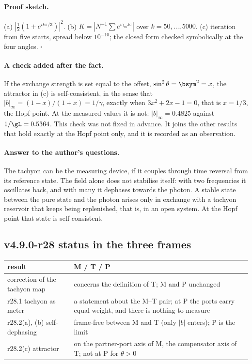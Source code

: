 \paragraph{Proof sketch.}
(a) \(|\tfrac12(1+e^{ik\pi/3})|^2\).  (b) \(K=|N^{-1}\sum e^{i\gamma_mk\tau}|\) over \(k=50,\dots,5000\).  (c) iteration from five starts, spread below
\(10^{-10}\); the closed form checked symbolically at the four angles.  \(\square\)

\paragraph{A check added after the fact.}
If the exchange strength is set equal to the offset, \(\sin^2\theta=\bsym^2=x\), the attractor in (c) is self-consistent, in the sense that
\(|b|_\infty=(1-x)/(1+x)=1/\gamma\), exactly when \(3x^2+2x-1=0\), that is \(x=1/3\), the Hopf point.  At the measured values it is not:
\(|b|_\infty=0.4825\) against \(1/\gL=0.5364\).  This check was not fixed in advance.  It joins the other results that hold exactly at the
Hopf point only, and it is recorded as an observation.

\paragraph{Answer to the author's questions.}
The tachyon can be the measuring device, if it couples through time reversal from its reference state.  The field alone does not
stabilise itself: with two frequencies it oscillates back, and with many it dephases towards the photon.  A stable state between the
pure state and the photon arises only in exchange with a tachyon reservoir that keeps being replenished, that is, in an open system.
At the Hopf point that state is self-consistent.

\subsection*{v4.9.0-r28 status in the three frames}
\label{subsec:v490-r28-frames}

\begin{center}
\small
\begin{tabular}{@{}>{\raggedright\arraybackslash}p{}>{\raggedright\arraybackslash}p{}@{}}
\toprule
result & M / T / P\\
\midrule
correction of the tachyon map & concerns the definition of T; M and P unchanged\\
r28.1 tachyon as meter & a statement about the M--T pair; at P the ports carry equal weight, and there is nothing to measure\\
r28.2(a), (b) self-dephasing & frame-free between M and T (only \(|b|\) enters); P is the limit\\
r28.2(c) attractor & on the partner-port axis of M, the compensator axis of T; not at P for \(\theta>0\)\\
\bottomrule
\end{tabular}
\end{center}

